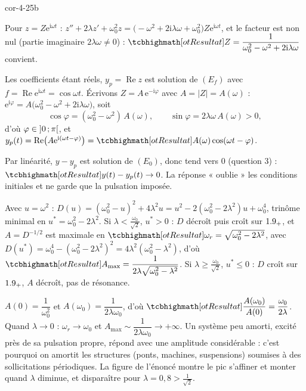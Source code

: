 \begin{blocLivre}{cor-4-25b}
\begin{corrigeSuite}
\begin{questions}[start=4]
  \item Pour $z=Z\mathrm{e}^{\mathrm{i}\omega t}$ :
    $z''+2\lambda z'+\omega_0^{2}z
    =\bigl(-\omega^{2}+2\mathrm{i}\lambda\omega+\omega_0^{2}\bigr)Z\mathrm{e}^{\mathrm{i}\omega t}$,
    et le facteur est non nul (partie imaginaire $2\lambda\omega\neq0$) :
    $\res{Z=\dfrac{1}{\omega_0^{2}-\omega^{2}+2\mathrm{i}\lambda\omega}}$
    convient.
  \item Les coefficients étant réels, $y_p=\operatorname{Re}z$ est
    solution de $(E_f)$ avec $f=\operatorname{Re}\mathrm{e}^{\mathrm{i}\omega t}=\cos\omega t$.
    Écrivons $Z=A\,\mathrm{e}^{-\mathrm{i}\varphi}$ avec $A=|Z|=A(\omega)$ :
    $\mathrm{e}^{\mathrm{i}\varphi}=A\bigl(\omega_0^{2}-\omega^{2}+2\mathrm{i}\lambda\omega\bigr)$,
    soit
    \[
    \cos\varphi=(\omega_0^{2}-\omega^{2})\,A(\omega),\qquad
    \sin\varphi=2\lambda\omega\,A(\omega)>0 ,
    \]
    d'où $\varphi\in\mathopen{]}0\,{;}\,\pi\mathclose{[}$, et
    $y_p(t)=\operatorname{Re}\bigl(A\mathrm{e}^{\mathrm{i}(\omega t-\varphi)}\bigr)
    =\res{A(\omega)\cos(\omega t-\varphi)}$.
  \item Par linéarité, $y-y_p$ est solution de $(E_0)$, donc tend vers
    $0$ (question 3) : $\res{y(t)-y_p(t)\to0}$. La réponse « oublie » les
    conditions initiales et ne garde que la pulsation imposée.
\end{questions}
\begin{questions}[start=7]
  \item Avec $u=\omega^{2}$ :
    $D(u)=(\omega_0^{2}-u)^{2}+4\lambda^{2}u=u^{2}-2(\omega_0^{2}-2\lambda^{2})u+\omega_0^{4}$,
    trinôme minimal en $u^{*}=\omega_0^{2}-2\lambda^{2}$. Si
    $\lambda<\frac{\omega_0}{\sqrt2}$, $u^{*}>0$ : $D$ décroît puis croît
    sur $1.9_{+}$, et $A=D^{-1/2}$ est maximale en
    $\res{\omega_r=\sqrt{\omega_0^{2}-2\lambda^{2}}}$, avec
    $D(u^{*})=\omega_0^{4}-(\omega_0^{2}-2\lambda^{2})^{2}
    =4\lambda^{2}(\omega_0^{2}-\lambda^{2})$, d'où
    $\res{A_{\max}=\dfrac{1}{2\lambda\sqrt{\omega_0^{2}-\lambda^{2}}}}$.
    Si $\lambda\geqslant\frac{\omega_0}{\sqrt2}$, $u^{*}\leqslant0$ : $D$
    croît sur $1.9_{+}$, $A$ décroît, pas de résonance.
  \item $A(0)=\dfrac{1}{\omega_0^{2}}$ et $A(\omega_0)=\dfrac{1}{2\lambda\omega_0}$,
    d'où $\res{\dfrac{A(\omega_0)}{A(0)}=\dfrac{\omega_0}{2\lambda}}$.
    Quand $\lambda\to0$ : $\omega_r\to\omega_0$ et
    $A_{\max}\sim\dfrac{1}{2\lambda\omega_0}\to+\infty$. Un système peu
    amorti, excité près de sa pulsation propre, répond avec une amplitude
    considérable : c'est pourquoi on amortit les structures (ponts,
    machines, suspensions) soumises à des sollicitations périodiques. La
    figure de l'énoncé montre le pic s'affiner et monter quand $\lambda$
    diminue, et disparaître pour $\lambda=0{,}8>\frac{1}{\sqrt2}$.
\end{questions}
\end{corrigeSuite}
\end{blocLivre}

